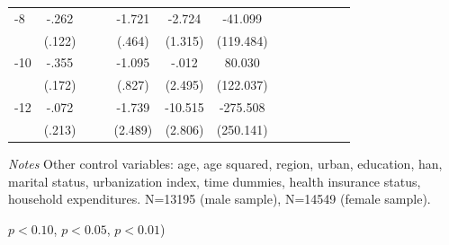 \begin{table}[hp]
\begin{adjustbox}{max width=\linewidth}
\begin{threeparttable}
{\begin{tabular}{l*{6}{S
S}}
-8             &    -.262\sym{**} &         &         &   -1.721\sym{***}&   -2.724\sym{**} &  -41.099         \\
                &   (.122)         &         &         &   (.464)         &  (1.315)         &(119.484)         \\
-10            &    -.355\sym{**} &         &         &   -1.095         &    -.012         &   80.030         \\
                &   (.172)         &         &         &   (.827)         &  (2.495)         &(122.037)         \\
-12           &    -.072         &         &         &   -1.739         &  -10.515\sym{***}& -275.508         \\
                &   (.213)         &         &         &  (2.489)         &  (2.806)         &(250.141)         \\
\bottomrule
\end{tabular}
\begin{tablenotes}
\item \textit{Notes} Other control variables: age, age squared, region, urban, education, han, marital status, urbanization index, time dummies, health insurance status, household expenditures. N=13195 (male sample), N=14549 (female sample).
\item \sym{*} \(p<0.10\), \sym{**} \(p<0.05\), \sym{***} \(p<0.01\))
\end{tablenotes}
}
\end{threeparttable}
\end{adjustbox}
\end{table}

